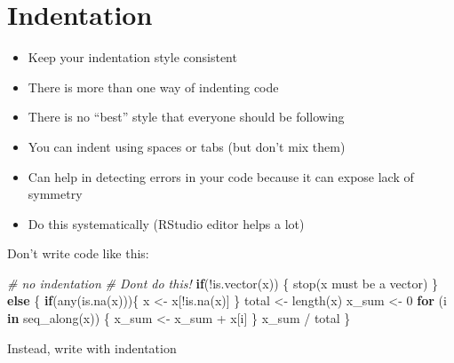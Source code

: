 \documentclass[
]{book}
\newenvironment{Shaded}{\begin{snugshade}}{\end{snugshade}}
\newcommand{\CommentTok}[1]{\textcolor[rgb]{0.56,0.35,0.01}{\textit{#1}}}
\newcommand{\ControlFlowTok}[1]{\textcolor[rgb]{0.13,0.29,0.53}{\textbf{#1}}}
\newcommand{\DecValTok}[1]{\textcolor[rgb]{0.00,0.00,0.81}{#1}}
\newcommand{\FunctionTok}[1]{\textcolor[rgb]{0.00,0.00,0.00}{#1}}
\newcommand{\NormalTok}[1]{#1}
\newcommand{\OtherTok}[1]{\textcolor[rgb]{0.56,0.35,0.01}{#1}}
\newcommand{\SpecialCharTok}[1]{\textcolor[rgb]{0.00,0.00,0.00}{#1}}
\newcommand{\StringTok}[1]{\textcolor[rgb]{0.31,0.60,0.02}{#1}}
\begin{document}
\hypertarget{indentation}{%
\section{Indentation}\label{indentation}}

\begin{itemize}
\item
  Keep your indentation style consistent
\item
  There is more than one way of indenting code
\item
  There is no ``best'' style that everyone should be following
\item
  You can indent using spaces or tabs (but don't mix them)
\item
  Can help in detecting errors in your code because it can expose lack of symmetry
\item
  Do this systematically (RStudio editor helps a lot)
\end{itemize}

Don't write code like this:

\begin{Shaded}
\begin{Highlighting}[]
\CommentTok{\# no indentation}
\CommentTok{\# Don\textquotesingle{}t do this!}
\ControlFlowTok{if}\NormalTok{(}\SpecialCharTok{!}\FunctionTok{is.vector}\NormalTok{(x)) \{}
\FunctionTok{stop}\NormalTok{(}\StringTok{\textquotesingle{}x must be a vector\textquotesingle{}}\NormalTok{)}
\NormalTok{\} }\ControlFlowTok{else}\NormalTok{ \{}
\ControlFlowTok{if}\NormalTok{(}\FunctionTok{any}\NormalTok{(}\FunctionTok{is.na}\NormalTok{(x)))\{}
\NormalTok{x }\OtherTok{\textless{}{-}}\NormalTok{ x[}\SpecialCharTok{!}\FunctionTok{is.na}\NormalTok{(x)]}
\NormalTok{\}}
\NormalTok{total }\OtherTok{\textless{}{-}} \FunctionTok{length}\NormalTok{(x)}
\NormalTok{x\_sum }\OtherTok{\textless{}{-}} \DecValTok{0}
\ControlFlowTok{for}\NormalTok{ (i }\ControlFlowTok{in} \FunctionTok{seq\_along}\NormalTok{(x)) \{}
\NormalTok{  x\_sum }\OtherTok{\textless{}{-}}\NormalTok{ x\_sum }\SpecialCharTok{+}\NormalTok{ x[i]}
\NormalTok{\}}
\NormalTok{x\_sum }\SpecialCharTok{/}\NormalTok{ total}
\NormalTok{\}}
\end{Highlighting}
\end{Shaded}

Instead, write with indentation
\end{document}
